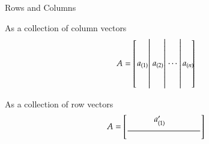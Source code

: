 \documentclass[10pt]{beamer}
\begin{document}
\begin{frame}{Rows and Columns}

\begin{minipage}[t]{0.45\textwidth}
As a collection of column vectors
\begin{equation*}
    A =
    \begin{bmatrix}\left. \begin{matrix} \\ \\ a_{(1)}  \\ \\ \\ \end{matrix}\right|
                   \left. \begin{matrix} \\ \\ a_{(2)}  \\ \\ \\ \end{matrix}\right|
                   \left. \begin{matrix} \\ \\ {\cdots\ } \\ \\ \\ \end{matrix}\right|
                          \begin{matrix} \\ \\ a_{(n)}  \\ \\ \\ \end{matrix}\negthickspace
    \end{bmatrix}
\end{equation*}
\end{minipage}
\hspace{3ex}
\begin{minipage}[t]{0.45\textwidth}
As a collection of row vectors
\begin{equation*}
    A =
    \begin{bmatrix}\begin{matrix} & & a'_{(1)}& & & \end{matrix} \\
                   \dfrac{\makebox[1.2in]{}}{\makebox[1.2in]{}} \\

\end{bmatrix}
\end{equation*}
\end{minipage}
\end{frame}
\end{document}
